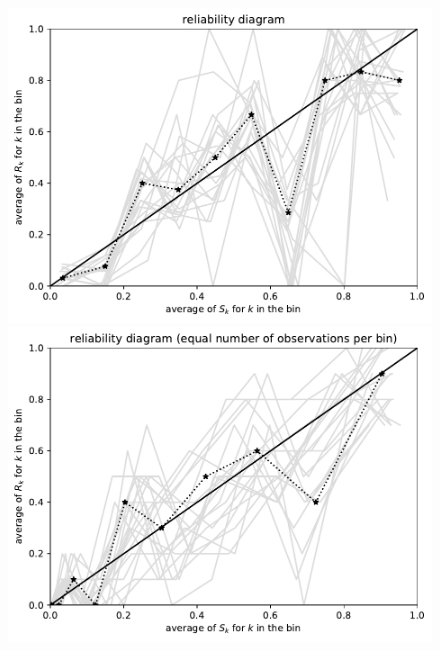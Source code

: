 \documentclass{article}
\begin{document}
\begin{figure}
\begin{centering}
\parbox{\imsize}{\includegraphics[width=\imsize]
                {./codes/unweighted/100_10_1_3/equiprob.pdf}}
\quad\quad
\parbox{\imsize}{\includegraphics[width=\imsize]
                {./codes/unweighted/100_10_1_3/equisamp.pdf}}

\vspace{\vertsep}


\end{centering}
\end{figure}
\end{document}

